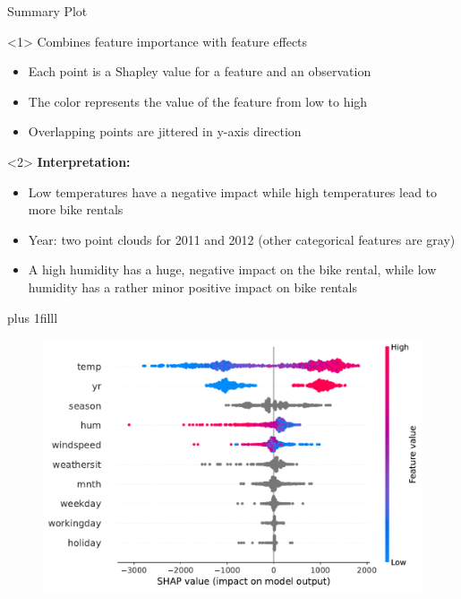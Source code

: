 \documentclass[11pt,compress,t,notes=noshow, aspectratio=169, xcolor=table]{beamer}
\newcommand{\btVFill}{\vskip0pt plus 1filll}
\begin{document}
\begin{frame}{Summary Plot}
\begin{onlyenv}<1>
Combines feature importance with feature effects
\begin{itemize}
    \item Each point is a Shapley value for a feature and an observation
    \item The color represents the value of the feature from low to high
    \item Overlapping points are jittered in y-axis direction
\end{itemize}
\end{onlyenv}

\begin{onlyenv}<2>
\textbf{Interpretation:}\\
\begin{itemize}
    \item Low temperatures have a negative impact while high temperatures lead to more bike rentals
    \item Year: two point clouds for 2011 and 2012 (other categorical features are gray)
    \item A high humidity has a huge, negative impact on the bike rental, while low humidity has a rather minor positive impact on bike rentals
\end{itemize}
 
\end{onlyenv}

\btVFill

\begin{figure}
    \centering
    \includegraphics[width=0.5\columnwidth]{figure_man/global_shap_jitter.pdf}
    
\end{figure}
\end{frame} 
\end{document}
